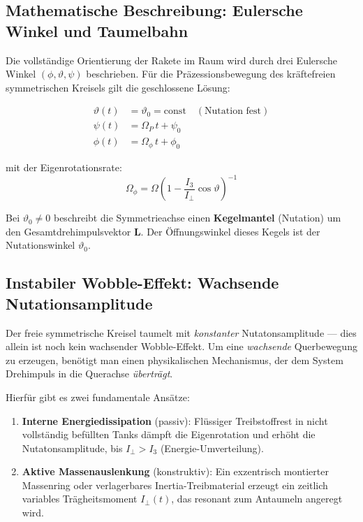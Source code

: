 ﻿\documentclass[12pt,a4paper]{article}
\newcommand{\vek}[1]{\boldsymbol{#1}}
\begin{document}
\subsection{Mathematische Beschreibung: Eulersche Winkel und Taumelbahn}

Die vollständige Orientierung der Rakete im Raum wird durch drei Eulersche Winkel
$(\phi, \vartheta, \psi)$ beschrieben. Für die Präzessionsbewegung des kräftefreien
symmetrischen Kreisels gilt die geschlossene Lösung:

\begin{align}
  \vartheta(t) &= \vartheta_0 = \mathrm{const} \quad (\text{Nutation fest})\\
  \psi(t)      &= \Omega_P\,t + \psi_0\\
  \phi(t)      &= \Omega_\phi\,t + \phi_0
\end{align}

mit der Eigenrotationsrate:
\[
  \Omega_\phi = \Omega\left(1 - \frac{I_3}{I_\perp}\cos\vartheta\right)^{-1}
\]

Bei $\vartheta_0 \neq 0$ beschreibt die Symmetrieachse einen \textbf{Kegelmantel}
(Nutation) um den Gesamtdrehimpulsvektor $\vek{L}$. Der Öffnungswinkel dieses
Kegels ist der Nutationswinkel $\vartheta_0$.

\subsection{Instabiler Wobble-Effekt: Wachsende Nutationsamplitude}

Der freie symmetrische Kreisel taumelt mit \emph{konstanter} Nutatonsamplitude ---
dies allein ist noch kein wachsender Wobble-Effekt. Um eine \emph{wachsende}
Querbewegung zu erzeugen, benötigt man einen physikalischen Mechanismus, der
dem System Drehimpuls in die Querachse \emph{überträgt}.

Hierfür gibt es zwei fundamentale Ansätze:

\begin{enumerate}[leftmargin=*, label=\alph*)]
  \item \textbf{Interne Energiedissipation} (passiv): Flüssiger Treibstoffrest
    in nicht vollständig befüllten Tanks dämpft die Eigenrotation und erhöht
    die Nutatonsamplitude, bis $I_\perp > I_3$ (Energie-Umverteilung).
  \item \textbf{Aktive Massenauslenkung} (konstruktiv): Ein exzentrisch montierter
    Massenring oder verlagerbares Inertia-Treibmaterial erzeugt ein zeitlich
    variables Trägheitsmoment $I_\perp(t)$, das resonant zum Antaumeln angeregt wird.
\end{enumerate}
\end{document}
